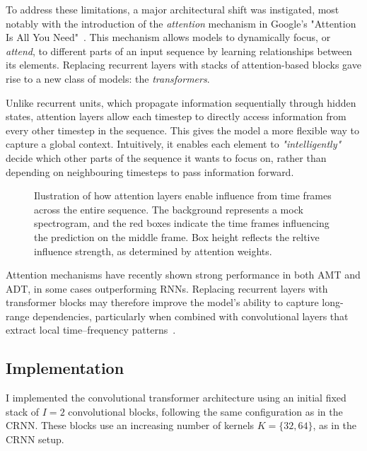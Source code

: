 To address these limitations, a major architectural shift was instigated, most notably with the introduction of the \textit{attention} mechanism in Google's "Attention Is All You Need"~\cite{NIPS2017_3f5ee243}. This mechanism allows models to dynamically focus, or \textit{attend}, to different parts of an input sequence by learning relationships between its elements. Replacing recurrent layers with stacks of attention-based blocks gave rise to a new class of models: the \textit{transformers}.

Unlike recurrent units, which propagate information sequentially through hidden states, attention layers allow each timestep to directly access information from every other timestep in the sequence. This gives the model a more flexible way to capture a global context. Intuitively, it enables each element to \textit{"intelligently"} decide which other parts of the sequence it wants to focus on, rather than depending on neighbouring timesteps to pass information forward.

\begin{figure}[H]
    \centering
    
    \caption{Ilustration of how attention layers enable influence from time frames across the entire sequence. The background represents a mock spectrogram, and the red boxes indicate the time frames influencing the prediction on the middle frame. Box height reflects the reltive influence strength, as determined by attention weights.}
    \label{CTInfluenceFigure}
\end{figure}

Attention mechanisms have recently shown strong performance in both \gls{AMT} and \gls{ADT}, in some cases outperforming \glspl{RNN}. Replacing recurrent layers with transformer blocks may therefore improve the model's ability to capture long-range dependencies, particularly when combined with convolutional layers that extract local time–frequency patterns~\cite{9747048, gardner2022mt3multitaskmultitrackmusic, signals4040042, chang2024yourmt3+, zehren2024analyzingreducingsynthetictorealtransfer}.

\subsection{Implementation}

I implemented the convolutional transformer architecture using an initial fixed stack of $I = 2$ convolutional blocks, following the same configuration as in the \gls{CRNN}. These blocks use an increasing number of kernels $K = \{32, 64\}$, as in the \gls{CRNN} setup. 

